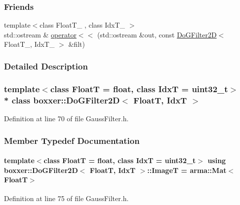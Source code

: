 \subsubsection*{Friends}
\begin{DoxyCompactItemize}
\item 
{\footnotesize template$<$class Float\+T\+\_\+ , class Idx\+T\+\_\+ $>$ }\\std\+::ostream \& \hyperlink{classboxxer_1_1DoGFilter2D_a5226e7e31cc72aeef946cd5d60bc3f49}{operator$<$$<$} (std\+::ostream \&out, const \hyperlink{classboxxer_1_1DoGFilter2D}{Do\+G\+Filter2D}$<$ Float\+T\+\_\+, Idx\+T\+\_\+ $>$ \&filt)
\end{DoxyCompactItemize}


\subsubsection{Detailed Description}
\subsubsection*{template$<$class FloatT = float, class IdxT = uint32\+\_\+t$>$\\*
class boxxer\+::\+Do\+G\+Filter2\+D$<$ Float\+T, Idx\+T $>$}



Definition at line 70 of file Gauss\+Filter.\+h.



\subsubsection{Member Typedef Documentation}
\paragraph[{\texorpdfstring{ImageT}{ImageT}}]{\setlength{\rightskip}{0pt plus 5cm}template$<$class FloatT  = float, class IdxT  = uint32\+\_\+t$>$ using {\bf boxxer\+::\+Do\+G\+Filter2D}$<$ FloatT, IdxT $>$\+::{\bf ImageT} =  arma\+::\+Mat$<$FloatT$>$}\hypertarget{classboxxer_1_1DoGFilter2D_aef097cf982b1705c47b2e2b34baf1bb1}{}\label{classboxxer_1_1DoGFilter2D_aef097cf982b1705c47b2e2b34baf1bb1}


Definition at line 75 of file Gauss\+Filter.\+h.


